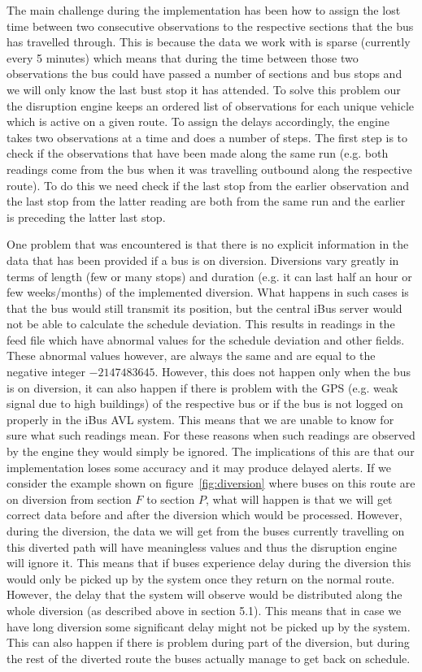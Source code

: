 The main challenge during the implementation has been how to assign the lost time between two consecutive observations to the respective sections that the bus has travelled through. This is because the data we work with is sparse (currently every 5 minutes) which means that during the time between those two observations the bus could have passed a number of sections and bus stops and we will only know the last bust stop it has attended. To solve this problem our the disruption engine keeps an ordered list of observations for each unique vehicle which is active on a given route. To assign the delays accordingly, the engine takes two observations at a time and does a number of steps. The first step is to check if the observations that have been made along the same run (e.g. both readings come from the bus when it was travelling outbound along the respective route). To do this we need check if the last stop from the earlier observation and the last stop from the latter reading are both from the same run and the earlier is preceding the latter last stop.

One problem that was encountered is that there is no explicit information in the data that has been provided if a bus is on diversion. Diversions vary greatly in terms of length (few or many stops) and duration (e.g. it can last half an hour or few weeks/months) of the implemented diversion. What happens in such cases is that the bus would still transmit its position, but the central iBus server would not be able to calculate the schedule deviation. This results in readings in the feed file which have abnormal values for the schedule deviation and other fields. These abnormal values however, are always the same and are equal to the negative integer $-2147483645$. However, this does not happen only when the bus is on diversion, it can also happen if there is problem with the GPS (e.g. weak signal due to high buildings) of the respective bus or if the bus is not logged on properly in the iBus AVL system. This means that we are unable to know for sure what such readings mean. For these reasons when such readings are observed by the engine they would simply be ignored. The implications of this are that our implementation loses some accuracy and it may produce delayed alerts. If we consider the example shown on figure~\ref{fig:diversion} where buses on this route are on diversion from section $F$ to section $P$, what will happen is that we will get correct data before and after the diversion which would be processed. However, during the diversion, the data we will get from the buses currently travelling on this diverted path will have meaningless values and thus the disruption engine will ignore it. This means that if buses experience delay during the diversion this would only be picked up by the system once they return on the normal route. However, the delay that the system will observe would be distributed along the whole diversion (as described above in section 5.1). This means that in case we have long diversion some significant delay might not be picked up by the system. This can also happen if there is problem during part of the diversion, but during the rest of the diverted route the buses actually manage to get back on schedule.

